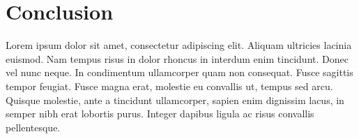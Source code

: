 \chapter{Conclusion}
\label{Chapter4} %

\noindent Lorem ipsum dolor sit amet, consectetur adipiscing elit. Aliquam ultricies lacinia euismod. Nam tempus risus in dolor rhoncus in interdum enim tincidunt. Donec vel nunc neque. In condimentum ullamcorper quam non consequat. Fusce sagittis tempor feugiat. Fusce magna erat, molestie eu convallis ut, tempus sed arcu. Quisque molestie, ante a tincidunt ullamcorper, sapien enim dignissim lacus, in semper nibh erat lobortis purus. Integer dapibus ligula ac risus convallis pellentesque.

\par\vspace{0.5cm}
\noindent {}\\